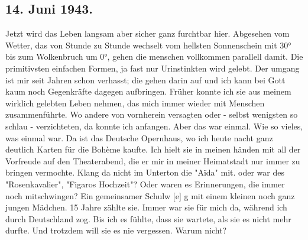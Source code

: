 \subsection{14. Juni 1943.}

Jetzt wird das Leben langsam aber sicher ganz furchtbar hier.
Abgesehen vom Wetter, das von Stunde zu Stunde wechselt vom hellsten Sonnenschein mit 30° bis zum Wolkenbruch um 0°, gehen die menschen vollkommen parallell damit.
Die primitivsten einfachen Formen, ja fast nur Urinstinkten wird gelebt.
Der umgang ist mir seit Jahren schon verhasst; die gehen darin auf und ich kann bei Gott kaum noch Gegenkr\"{a}fte dagegen aufbringen. Fr\"{u}her konnte ich sie aus meinem wirklich gelebten Leben nehmen, das mich immer wieder mit Menschen zusammenf\"{u}hrte.
Wo andere von vornherein versagten oder - selbst wenigsten so schlau - verzichteten, da konnte ich anfangen.
Aber das war einmal.
Wie so vieles, was einmal war.
Da ist das Deutsche Opernhaus, wo ich heute nacht ganz deutlich Karten f\"{u}r die Bohème kaufte.
Ich hielt sie in meinen h\"{a}nden mit all der Vorfreude auf den Theaterabend, die er mir in meiner Heimatstadt nur immer zu bringen vermochte.
Klang da nicht im Unterton die "Aïda" mit. oder war des "Rosenkavalier", "Figaros Hochzeit"?
Oder waren es Erinnerungen, die immer noch mitschwingen?
Ein gemeinsamer Schulw{\color{red} [e] }g mit einem kleinen noch ganz jungen M\"{a}dchen.
15 Jahre z\"{a}hlte sie.
Immer war sie f\"{u}r mich da, w\"{a}hrend ich durch Deutschland zog.
Bis ich es f\"{u}hlte, dass sie wartete, als sie es nicht mehr durfte.
Und trotzdem will sie es nie vergessen.
Warum nicht?

\clearpage
